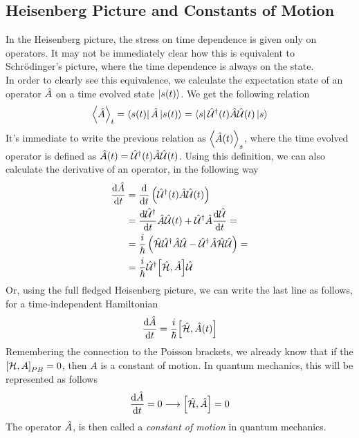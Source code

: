 \documentclass[../qm.tex]{subfiles}
\begin{document}
	\subsection{Heisenberg Picture and Constants of Motion}
	In the Heisenberg picture, the stress on time dependence is given only on operators. It may not be immediately clear how this is equivalent to Schrödinger's picture, where the time dependence is always on the state.\\
	In order to clearly see this equivalence, we calculate the expectation state of an operator $\hat{A}$ on a time evolved state $\ket{s(t)}$. We get the following relation
	\begin{equation}
		\expval{\hat{A}}_t=\bra{s(t)}\hat{A}\ket{s(t)}=\bra{s}\hat{\mathcal{U}}^{\dagger}(t)\hat{A}\hat{\mathcal{U}}(t)\ket{s}
		\label{eq:timeevolvedexpval}
	\end{equation}
	It's immediate to write the previous relation as $\expval{\hat{A}(t)}_s$, where the time evolved operator is defined as $\hat{A}(t)=\hat{\mathcal{U}}^{\dagger}(t)\hat{A}\hat{\mathcal{U}}(t)$. Using this definition, we can also calculate the derivative of an operator, in the following way
	\begin{equation}
		\begin{aligned}
			\derivative{\opr{A}}{t}&=\derivative{t}\left( \adj{\U}(t)\opr{A}\U(t) \right)\\
			&=\derivative{\adj{\U}}{t}\opr{A}\U(t)+\adj{\U}\opr{A}\derivative{\U}{t}=\\
			&=\frac{i}{\hbar}\left( \opr{\ham}\adj{\U}\opr{A}\U-\adj{\U}\opr{A}\opr{\ham}\U \right)=\\
			&=\frac{i}{\hbar}\adj{\U}\comm{\opr{\ham}}{\opr{A}}\U
		\end{aligned}
		\label{eq:timederop}
	\end{equation}
	Or, using the full fledged Heisenberg picture, we can write the last line as follows, for a time-independent Hamiltonian
	\begin{equation}
		\derivative{\opr{A}}{t}=\frac{i}{\hbar}\comm{\opr{\ham}}{\opr{A}(t)}
		\label{eq:oprder}
	\end{equation}
	Remembering the connection to the Poisson brackets, we already know that if the $\pcomm{\ham}{A}=0$, then $A$ is a constant of motion. In quantum mechanics, this will be represented as follows
	\begin{equation}
		\derivative{\opr{A}}{t}=0\longrightarrow\comm{\opr{\ham}}{\opr{A}}=0
		\label{eq:constantofmotion}
	\end{equation}
	The operator $\hat{A}$, is then called a \textit{constant of motion} in quantum mechanics.
\end{document}

